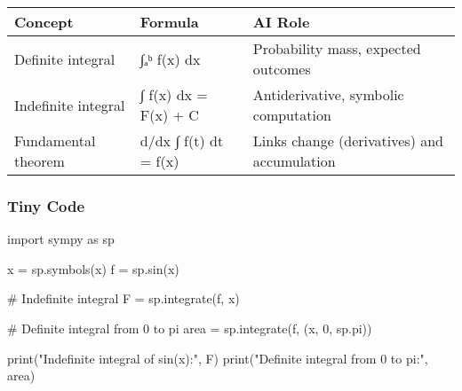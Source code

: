\documentclass[
  letterpaper,
  DIV=11,
  numbers=noendperiod]{scrreprt}
\newenvironment{Shaded}{\begin{snugshade}}{\end{snugshade}}
\newcommand{\BuiltInTok}[1]{\textcolor[rgb]{0.00,0.23,0.31}{#1}}
\newcommand{\CommentTok}[1]{\textcolor[rgb]{0.37,0.37,0.37}{#1}}
\newcommand{\DecValTok}[1]{\textcolor[rgb]{0.68,0.00,0.00}{#1}}
\newcommand{\ImportTok}[1]{\textcolor[rgb]{0.00,0.46,0.62}{#1}}
\newcommand{\NormalTok}[1]{\textcolor[rgb]{0.00,0.23,0.31}{#1}}
\newcommand{\OperatorTok}[1]{\textcolor[rgb]{0.37,0.37,0.37}{#1}}
\newcommand{\StringTok}[1]{\textcolor[rgb]{0.13,0.47,0.30}{#1}}
\begin{document}
\begin{longtable}[]{@{}
  >{\raggedright\arraybackslash}p{}
  >{\raggedright\arraybackslash}p{}
  >{\raggedright\arraybackslash}p{}@{}}
\toprule\noalign{}
\begin{minipage}[b]{\linewidth}\raggedright
Concept
\end{minipage} & \begin{minipage}[b]{\linewidth}\raggedright
Formula
\end{minipage} & \begin{minipage}[b]{\linewidth}\raggedright
AI Role
\end{minipage} \\
\midrule\noalign{}
\endhead
\bottomrule\noalign{}
\endlastfoot
Definite integral & ∫ₐᵇ f(x) dx & Probability mass, expected outcomes \\
Indefinite integral & ∫ f(x) dx = F(x) + C & Antiderivative, symbolic
computation \\
Fundamental theorem & d/dx ∫ f(t) dt = f(x) & Links change (derivatives)
and accumulation \\
\end{longtable}

\subsubsection{Tiny Code}\label{tiny-code-116}

\begin{Shaded}
\begin{Highlighting}[]
\ImportTok{import}\NormalTok{ sympy }\ImportTok{as}\NormalTok{ sp}

\NormalTok{x }\OperatorTok{=}\NormalTok{ sp.symbols(}\StringTok{\textquotesingle{}x\textquotesingle{}}\NormalTok{)}
\NormalTok{f }\OperatorTok{=}\NormalTok{ sp.sin(x)}

\CommentTok{\# Indefinite integral}
\NormalTok{F }\OperatorTok{=}\NormalTok{ sp.integrate(f, x)}

\CommentTok{\# Definite integral from 0 to pi}
\NormalTok{area }\OperatorTok{=}\NormalTok{ sp.integrate(f, (x, }\DecValTok{0}\NormalTok{, sp.pi))}

\BuiltInTok{print}\NormalTok{(}\StringTok{"Indefinite integral of sin(x):"}\NormalTok{, F)}
\BuiltInTok{print}\NormalTok{(}\StringTok{"Definite integral from 0 to pi:"}\NormalTok{, area)}
\end{Highlighting}
\end{Shaded}
\end{document}
